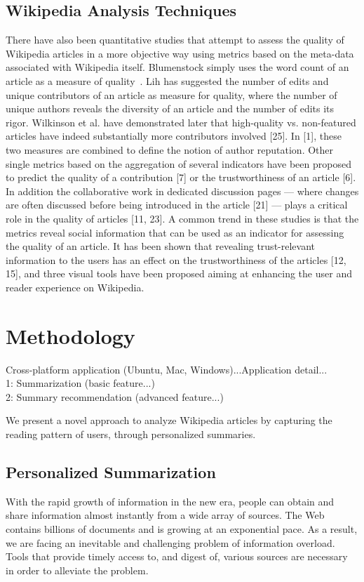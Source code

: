 \documentclass[12pt]{article}
\begin{document}
\subsection{Wikipedia Analysis Techniques}
\cite{chevalier2010wikipediaviz} There have also been quantitative studies that attempt to assess the
quality of Wikipedia articles in a more objective way using metrics based on the meta-data associated with Wikipedia itself. Blumenstock simply uses the word count of an article as a measure of
quality~\cite{blumenstock2008size}. Lih  has suggested the number of edits and unique
contributors of an article as measure for quality, where the number
of unique authors reveals the diversity of an article and the number of edits its rigor. Wilkinson et al. have demonstrated later
that high-quality vs. non-featured articles have indeed substantially
more contributors involved [25]. In [1], these two measures are
combined to define the notion of author reputation. Other single metrics based on the aggregation of several indicators have been
proposed to predict the quality of a contribution [7] or the trustworthiness of an article [6]. In addition the collaborative work in
dedicated discussion pages — where changes are often discussed
before being introduced in the article [21] — plays a critical role in
the quality of articles [11, 23].
A common trend in these studies is that the metrics reveal social
information that can be used as an indicator for assessing the quality of an article. It has been shown that revealing trust-relevant
information to the users has an effect on the trustworthiness of the
articles [12, 15], and three visual tools have been proposed aiming
at enhancing the user and reader experience on Wikipedia.



\section{Methodology}\label{sec:Proposed}

Cross-platform application (Ubuntu, Mac, Windows)...Application detail...\\
1: Summarization (basic feature...)\\
2: Summary recommendation (advanced feature...)


We present a novel approach to analyze Wikipedia articles by capturing the reading pattern of users, through personalized summaries. 

\subsection{Personalized Summarization}
With the rapid growth of information in the new era, people can obtain and share information
almost instantly from a wide array of sources. The Web contains billions of documents and
is growing at an exponential pace. As a result, we are facing an inevitable and challenging
problem of information overload. Tools that provide timely access to, and digest of, various
sources are necessary in order to alleviate the problem.
\end{document}
